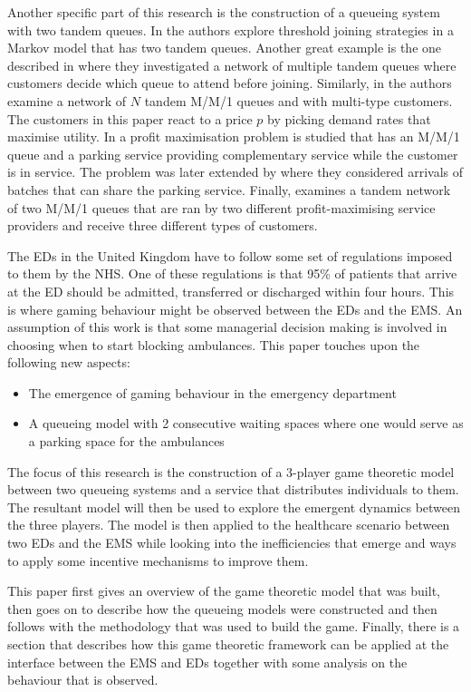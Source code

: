 Another specific part of this research is the construction of a queueing system
with two tandem queues.
In \cite{d2015pure} the authors explore threshold joining strategies in a 
Markov model that has two tandem queues.
Another great example is the one described in \cite{burnetas2013customer}
where they investigated a network of multiple tandem queues where customers 
decide which queue to attend before joining.
Similarly, in \cite{bacsar2002stackelberg} the authors examine a network of 
\(N\) tandem M/M/1 queues and with multi-type customers. 
The customers in this paper react to a price \(p\) by picking demand rates that 
maximise utility.
In \cite{veltman2005equilibrium} a profit maximisation problem is studied that
has an M/M/1 queue and a parking service providing complementary service while
the customer is in service. 
The problem was later extended by \cite{sun2009equilibrium} where they 
considered arrivals of batches that can share the parking service.
Finally, \cite{afeche2007decentralized} examines a tandem network of two M/M/1 
queues that are ran by two different profit-maximising service providers and 
receive three different types of customers.

The EDs in the United Kingdom have to follow some set of regulations imposed to 
them by the NHS.
One of these regulations is that 95\% of patients that arrive at the ED should 
be admitted, transferred or discharged within four hours.
This is where gaming behaviour might be observed between the EDs and the EMS.
An assumption of this work is that some managerial decision making is involved
in choosing when to start blocking ambulances.
This paper touches upon the following new aspects:
\begin{itemize}
    \item The emergence of gaming behaviour in the emergency department
    \item A queueing model with 2 consecutive waiting spaces where one would 
    serve as a parking space for the ambulances
\end{itemize}
The focus of this research is the construction of a 3-player game theoretic 
model between two queueing systems and a service that distributes individuals
to them. 
The resultant model will then be used to explore the emergent dynamics between 
the three players.
The model is then applied to the healthcare scenario between two EDs and the 
EMS while looking into the inefficiencies that emerge and ways to apply some 
incentive mechanisms to improve them.

This paper first gives an overview of the game theoretic model that was built, 
then goes on to describe how the queueing models were constructed and then 
follows with the methodology that was used to build the game.
Finally, there is a section that describes how this game theoretic framework
can be applied at the interface between the EMS and EDs together with some 
analysis on the behaviour that is observed.


